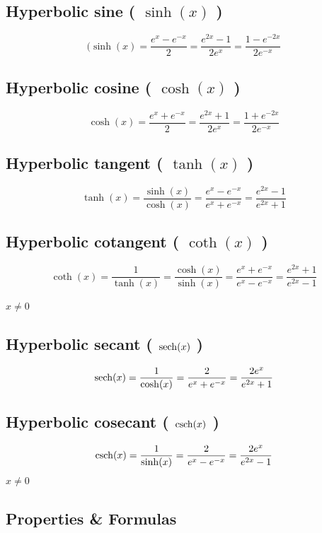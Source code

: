 \subsection{Hyperbolic sine ( $\sinh(x)$ ) }\label{sinh}
\[
    (\sinh(x) = {\displaystyle\frac{e^{x} - e^{-x}}{2}}={\displaystyle\frac{e^{2x} - 1}{2e^{x}}}={\displaystyle\frac{1 - e^{-2x}}{2e^{-x}}}
\]

\subsection{Hyperbolic cosine ( $\cosh(x)$ ) }\label{cosh}
\[
    \cosh(x) = {\displaystyle\frac{e^{x} + e^{-x}}{2}} = {\displaystyle\frac{e^{2x} + 1}{2e^{x}}} = {\displaystyle\frac{1 + e^{-2x}}{2e^{-x}}}
\]

\subsection{Hyperbolic tangent ( $\tanh(x)$ )}\label{tanh}
\[
    \tanh(x) = \displaystyle\frac{\sinh(x)}{\cosh(x)} = \displaystyle\frac{e^{x} - e^{-x}}{e^{x} + e^{-x}} = \displaystyle\frac{e^{2x} - 1}{e^{2x} + 1}
\]

\subsection{Hyperbolic cotangent ( $\coth(x)$ )}\label{coth}
\[
    \coth(x) = \displaystyle\frac{1}{\tanh(x)} = \displaystyle\frac{\cosh(x)}{\sinh(x)} = \displaystyle\frac{e^{x} + e^{-x}}{e^{x} - e^{-x}} = \displaystyle\frac{e^{2x} + 1}{e^{2x} - 1}
\]

$x \neq 0$

\subsection{Hyperbolic secant ( $\operatorname{sech}(x)$ )} \label{sech}
\[
    \operatorname{sech}(x) = \displaystyle\frac{1}{\cosh(x)} = \displaystyle\frac{2}{e^{x} + e^{-x}} = \displaystyle\frac{2e^{x}}{e^{2x} + 1}
\]

\subsection{Hyperbolic cosecant ( $\operatorname{csch}(x)$ )}\label{csch}
\[
    \operatorname{csch}(x) = \displaystyle\frac{1}{\sinh(x)} = \displaystyle\frac{2}{e^{x} - e^{-x}} = \displaystyle\frac{2e^{x}}{e^{2x} - 1}
\]
$x \neq 0$

\subsection{Properties \& Formulas}


